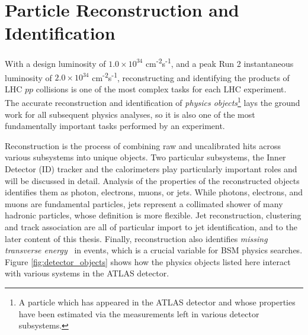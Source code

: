 \chapter{Particle Reconstruction and Identification}
\label{ch:part_reco}

With a design luminosity of $1.0 \times 10^{34}$ cm\textsuperscript{-2}s\textsuperscript{-1}, and a peak Run 2 instantaneous luminosity of $2.0 \times 10^{34}$ cm\textsuperscript{-2}s\textsuperscript{-1}, reconstructing and identifying the products of LHC $pp$ collisions is one of the most complex tasks for each LHC experiment. The accurate reconstruction and identification of \textit{physics objects}\footnote{A particle which has appeared in the ATLAS detector and whose properties have been estimated via the measurements left in various detector subsystems.} lays the ground work for all subsequent physics analyses, so it is also one of the most fundamentally important tasks performed by an experiment. \par

Reconstruction is the process of combining raw and uncalibrated hits across various subsystems into unique objects. Two particular subsystems, the Inner Detector (ID) tracker and the calorimeters play particularly important roles and will be discussed in detail. Analysis of the properties of the reconstructed objects identifies them as photon, electrons, muons, or jets. While photons, electrons, and muons are fundamental particles, jets represent a collimated shower of many hadronic particles, whose definition is more flexible. Jet reconstruction, clustering and track association are all of particular import to jet identification, and to the later content of this thesis. Finally, reconstruction also identifies \textit{missing transverse energy} \met~in events, which is a crucial variable for BSM physics searches. Figure \ref{fig:detector_objects} shows how the physics objects listed here interact with various systems in the ATLAS detector. 

